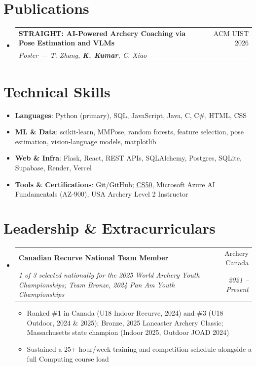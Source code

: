 \documentclass[letterpaper,10.5pt]{article}
\makeatletter
\newcommand{\resumeItem}[1]{
  \item \small{#1}
}
\newcommand{\resumeSubheading}[4]{
  \item
  \begin{tabular*}{0.97\textwidth}{l@{\extracolsep{\fill}}r}
    \textbf{#1} & #2 \\
    \textit{\small #3} & \textit{\small #4}
  \end{tabular*}
}
\newcommand{\resumeSubHeadingListStart}{
  \begin{itemize}[leftmargin=0.15in,label={}]
}
\newcommand{\resumeSubHeadingListEnd}{
  \end{itemize}
}
\newcommand{\resumeItemListStart}{
  \begin{itemize}[leftmargin=0.2in]
}
\newcommand{\resumeItemListEnd}{
  \end{itemize}
}
\makeatother
\begin{document}
\section{Publications}
  \resumeSubHeadingListStart
  \resumeSubheading
    {STRAIGHT: AI-Powered Archery Coaching via Pose Estimation and VLMs}{ACM UIST 2026}
    {Poster --- T. Zhang, \textbf{K. Kumar}, C. Xiao}{}
\resumeSubHeadingListEnd

\section{Technical Skills}
  \begin{itemize}[leftmargin=0.15in, label={}]
    \small
    \item{\textbf{Languages}: Python (primary), SQL, JavaScript, Java, C, C\#, HTML, CSS}
    \item{\textbf{ML \& Data}: scikit-learn, MMPose, random forests, feature selection, pose estimation, vision-language models, matplotlib}
    \item{\textbf{Web \& Infra}: Flask, React, REST APIs, SQLAlchemy, Postgres, SQLite, Supabase, Render, Vercel}
    \item {\textbf{Tools \& Certifications}: Git/GitHub; \href{https://courses.edx.org/certificates/cb0e31f1739d463aafdb3a7bc3814719}{CS50}, Microsoft Azure AI Fundamentals (AZ-900), USA Archery Level 2 Instructor}
  \end{itemize}

\section{Leadership \& Extracurriculars}
  \resumeSubHeadingListStart
    \resumeSubheading
      {Canadian Recurve National Team Member}{Archery Canada}
      {1 of 3 selected nationally for the 2025 World Archery Youth Championships; Team Bronze, 2024 Pan Am Youth Championships}{2021 -- Present}
      \resumeItemListStart
        \resumeItem{Ranked \#1 in Canada (U18 Indoor Recurve, 2024) and \#3 (U18 Outdoor, 2024 \& 2025); Bronze, 2025 Lancaster Archery Classic; Massachusetts state champion (Indoor 2025, Outdoor JOAD 2024)}
        \resumeItem{Sustained a 25+ hour/week training and competition schedule alongside a full Computing course load}
        \resumeItemListEnd
  \resumeSubHeadingListEnd
\end{document}
